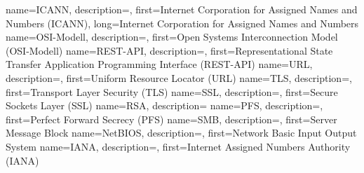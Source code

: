 {%
    name={ICANN},
    description={},
    first={Internet Corporation for Assigned Names and Numbers (ICANN)},
    long={Internet Corporation for Assigned Names and Numbers}
}
{%
    name={OSI-Modell},
    description={},
    first={Open Systems Interconnection Model (OSI-Modell)}
}
{%
    name={REST-API},
    description={},
    first={Representational State Transfer Application Programming Interface (REST-API)}
}
{%
    name={URL},
    description={},
    first={Uniform Resource Locator (URL)}
}
{%
    name={TLS},
    description={},
    first={Transport Layer Security (TLS)}
}
{%
    name={SSL},
    description={},
    first={Secure Sockets Layer (SSL)}
}
{%
    name={RSA},
    description={}
}
{%
    name={PFS},
    description={},
    first={Perfect Forward Secrecy (PFS)}
}
{%
    name={SMB},
    description={},
    first={Server Message Block}
}
{%
    name={NetBIOS},
    description={},
    first={Network Basic Input Output System}
}
{%
    name={IANA},
    description={},
    first={Internet Assigned Numbers Authority (IANA)}
}
